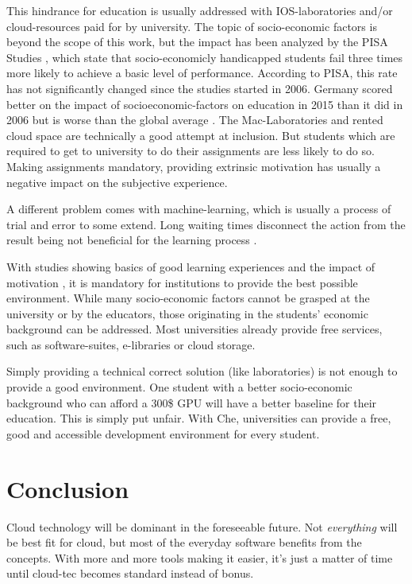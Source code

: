 \documentclass[english,utf8]{lni}
\begin{document}
This  hindrance  for  education  is  usually addressed  with  IOS-laboratories  and/or  cloud-resources paid for by university. 
The topic of socio-economic factors is beyond the scope of this work, but the impact has been analyzed by the PISA Studies \cite{PISA15}, which state that socio-economicly handicapped students fail three times more likely to achieve a basic level of performance.
According to PISA, this rate has not significantly changed since the studies started in 2006. 
Germany scored better on the impact of socioeconomic-factors on education in 2015 than it did in 2006 but is worse than the global average \cite{OECDCN15}.
The Mac-Laboratories and rented cloud space are technically a good attempt at inclusion. 
But students which are required to get to university to do their assignments are 
less  likely  to  do  so.
Making  assignments  mandatory, providing extrinsic motivation \cite{DECI93} has usually a negative impact on the subjective experience.

A different problem comes with machine-learning, which is usually a process of trial and error to some extend.
Long waiting times disconnect the action from the result being not beneficial for the learning process \cite{HU95}\cite{DECI93}. 

With studies showing basics of good learning experiences \cite{FI05}\cite{TC88} and the impact of motivation \cite{HU95}\cite{DECI93}, it is mandatory for institutions to provide the best possible environment. 
While many socio-economic factors cannot be grasped at the university or by the educators, those originating in the students' economic background can be addressed.
Most universities already provide free services, such as software-suites, e-libraries or cloud storage.

Simply providing a technical correct solution (like laboratories) is not enough to provide a good environment.
One student with a better socio-economic background who can afford a 300\$ GPU will have a better baseline for their education. 
This is simply put unfair.
With Che, universities can provide a free, good and accessible development environment for every student.
\newpage
\section{Conclusion}
\label{sec:Conclusion}
Cloud technology will be dominant in the foreseeable future. 
Not \textit{everything} will be best fit for cloud, but most of the everyday software benefits from the concepts. 
With more and more tools making it easier, it's just a matter of time until cloud-tec becomes standard instead of bonus.
\end{document}
